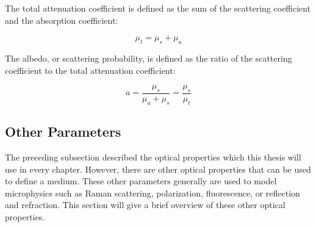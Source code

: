 The total attenuation coefficient is defined as the sum of the scattering coefficient and the absorption coefficient:

\begin{equation}
\mu_t=\mu_s+\mu_a
\end{equation}

The albedo, or scattering probability, is defined as the ratio of the scattering coefficient to the total attenuation coefficient:

\begin{equation}
a = \frac{\mu_s}{\mu_a+\mu_s}=\frac{\mu_s}{\mu_t}
\end{equation}


\subsection*{Other Parameters}\label{sec:other}
The preceding subsection described the optical properties which this thesis will use in every chapter. However, there are other optical properties that can be used to define a medium. These other parameters generally are used to model microphysics such as Raman scattering, polarization, fluorescence, or reflection and refraction. This section will give a brief overview of these other optical properties.







